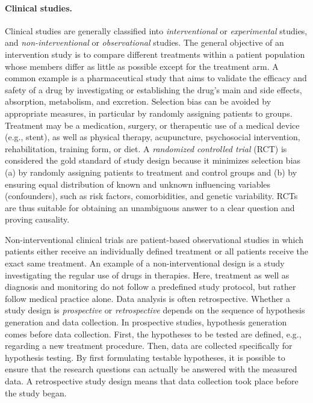 \documentclass[
  oneside]{book}
\begin{document}
\paragraph*{Clinical studies.}

Clinical studies are generally classified into \emph{interventional} or \emph{experimental} studies, and \emph{non-interventional} or \emph{observational} studies.
The general objective of an intervention study is to compare different treatments within a patient population whose members differ as little as possible except for the treatment arm.
A common example is a pharmaceutical study that aims to validate the efficacy and safety of a drug by investigating or establishing the drug's main and side effects, absorption, metabolism, and excretion.
Selection bias can be avoided by appropriate measures, in particular by randomly assigning patients to groups.
Treatment may be a medication, surgery, or therapeutic use of a medical device (e.g., stent), as well as physical therapy, acupuncture, psychosocial intervention, rehabilitation, training form, or diet.
A \emph{randomized controlled trial} (RCT) is considered the gold standard of study design because it minimizes selection bias (a) by randomly assigning patients to treatment and control groups and (b) by ensuring equal distribution of known and unknown influencing variables (confounders), such as risk factors, comorbidities, and genetic variability.
RCTs are thus suitable for obtaining an unambiguous answer to a clear question and proving causality.

Non-interventional clinical trials are patient-based observational studies in which patients either receive an individually defined treatment or all patients receive the exact same treatment.
An example of a non-interventional design is a study investigating the regular use of drugs in therapies.
Here, treatment as well as diagnosis and monitoring do not follow a predefined study protocol, but rather follow medical practice alone.
Data analysis is often retrospective.
Whether a study design is \emph{prospective} or \emph{retrospective} depends on the sequence of hypothesis generation and data collection.
In prospective studies, hypothesis generation comes before data collection.
First, the hypotheses to be tested are defined, e.g., regarding a new treatment procedure.
Then, data are collected specifically for hypothesis testing.
By first formulating testable hypotheses, it is possible to ensure that the research questions can actually be answered with the measured data.
A retrospective study design means that data collection took place before the study began.
\end{document}
